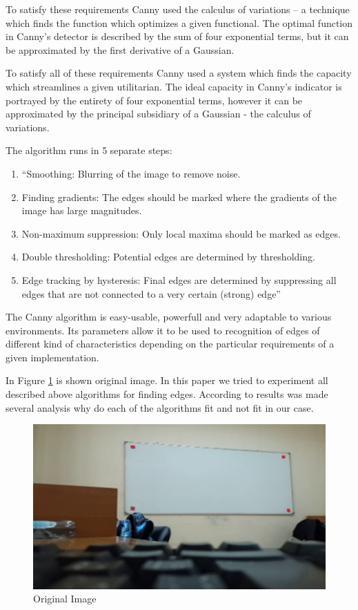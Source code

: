 To satisfy these requirements Canny used the calculus of variations – a technique which finds the function which optimizes a given functional. The optimal function in Canny's detector is described by the sum of four exponential terms, but it can be approximated by the first derivative of a Gaussian.

To satisfy all of these requirements Canny used a system which finds the capacity which streamlines a given utilitarian. The ideal capacity in Canny's indicator is portrayed by the entirety of four exponential terms, however it can be approximated by the principal subsidiary of a Gaussian - the calculus of variations.

The algorithm runs in 5 separate steps:
\begin{enumerate}
\item ``Smoothing: Blurring of the image to remove noise.
\item Finding gradients: The edges should be marked where the gradients of the image has large magnitudes.
\item Non-maximum suppression: Only local maxima should be marked as edges.
\item Double thresholding: Potential edges are determined by thresholding.
\item Edge tracking by hysteresis: Final edges are determined by suppressing all edges that are not connected to a very certain (strong) edge'' \cite{John}
\end{enumerate}

The Canny algorithm is easy-usable, powerfull and very adaptable to various environments. \cite{Marr} Its parameters allow it to be used to recognition of edges of different kind of characteristics depending on the particular requirements of a given implementation. \cite{Heath}

In Figure \ref{fig:original_image} is shown original image. In this paper we tried to experiment all described above algorithms for finding edges. According to results was made several analysis why do each of the algorithms fit and not fit in our case.

\begin{figure}[h]
    \centering
    \includegraphics[width=\textwidth]{Figures/original_image}
    \caption{Original Image}
    \label{fig:original_image}
\end{figure}

